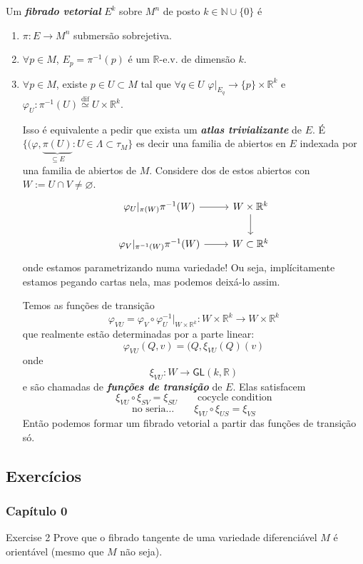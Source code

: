 \begin{defn}\leavevmode
Um \textit{\textbf{fibrado vetorial }} \(E^k\) sobre \(M^n\) de posto \(k \in \mathbb{N} \cup  \{0\}\) é
\begin{enumerate}
\item \(\pi:E \to M^n\) submersão sobrejetiva.
\item \(\forall  p \in M\), \(E_p = \pi^{-1}(p)\) é um \(\mathbb{R}\)-e.v. de dimensão \(k\).
\item \(\forall p \in M\), existe \(p \in U \subset M\) tal que \(\forall  q \in U\) \(\varphi|_{E_q} \to \{p\} \times \mathbb{R}^k\) e \(\varphi_U: \pi^{-1}(U) \overset{\operatorname{dif}}{\simeq}U \times \mathbb{R}^k\).

	Isso é equivalente a pedir que exista um \textit{\textbf{atlas trivializante}} de \(E\). É \(\{(\varphi,\underbrace{\pi(U)}_{\subseteq E}:U \in \Lambda \subset \tau_M\}\) es decir una familia de abiertos en \(E\) indexada por una familia de abiertos de \(M\). Considere dos de estos abiertos con \(W:=U \cap V \neq  \varnothing\).
	\[\begin{tikzcd}
		\varphi_U|_{\pi(W)}\pi^{-1}(W)\arrow[r]& W \times \mathbb{R}^k\arrow[d]\\
		\varphi_V|_{\pi^{-1}(W)}\pi^{-1}(W)\arrow[r]&W \subset \mathbb{R}^k
	\end{tikzcd}\]
onde estamos parametrizando numa variedade! Ou seja, implícitamente estamos pegando cartas nela, mas podemos deixá-lo assim.

Temos as funções de transição
\[\varphi_{VU}=\varphi_V \circ \varphi_U^{-1}|_{W\times\mathbb{R}^k}:W\times\mathbb{R}^k \to W \times \mathbb{R}^k\]
que realmente estão determinadas por a parte linear:
\[\varphi_{VU}(Q,v)=(Q,\xi_{VU}(Q)(v)\]
onde
\[\xi_{VU}:W \to \mathsf{GL}(k,\mathbb{R})\]
e são chamadas de \textit{\textbf{funções de transição}} de \(E\). Elas satisfacem
\[\xi_{VU}\circ\xi_{SV}=\xi_{SU}\qquad \text{cocycle condition} \]
\[\text{no seria…} \qquad \xi_{VU}\circ\xi_{US}=\xi_{VS}\]
Então podemos formar um fibrado vetorial a partir das funções de transição só.
\end{enumerate}
\end{defn}

\subsection{Exercícios}

\subsubsection{Capítulo 0}
\begin{thing4}{Exercise 2}\label{exer:2}\leavevmode
Prove que o fibrado tangente de uma variedade diferenciável \(M\) é orientável (mesmo que \(M\) não seja).
\end{thing4}

